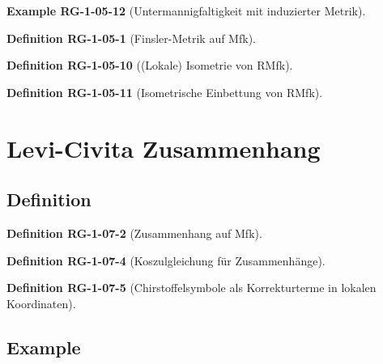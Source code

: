 \documentclass[10pt, letterpaper]{article}
\newcommand{\CustomHeading}[3]{%
  \par\medskip\noindent%
  \textbf{#1 #2} \textnormal{(#3)}.\enskip%
}
\newenvironment{DEF}[2]{\CustomHeading{Definition}{#1}{#2}}{}
\newenvironment{EXA}[2]{\CustomHeading{Example}{#1}{#2}}{}
\begin{document}
\begin{EXA}{RG-1-05-12}{Untermannigfaltigkeit mit induzierter Metrik}

\end{EXA}





\begin{DEF}{RG-1-05-1}{Finsler-Metrik auf Mfk}

\end{DEF}

\begin{DEF}{RG-1-05-10}{(Lokale) Isometrie von RMfk}

\end{DEF}

\begin{DEF}{RG-1-05-11}{Isometrische Einbettung von RMfk}

\end{DEF}












\section{Levi-Civita Zusammenhang}



\subsection{Definition}



\begin{DEF}{RG-1-07-2}{Zusammenhang auf Mfk}

\end{DEF}

\begin{DEF}{RG-1-07-4}{Koszulgleichung für Zusammenhänge}

\end{DEF}

\begin{DEF}{RG-1-07-5}{Chirstoffelsymbole als Korrekturterme in lokalen Koordinaten}

\end{DEF}







\subsection{Example}
\end{document}
